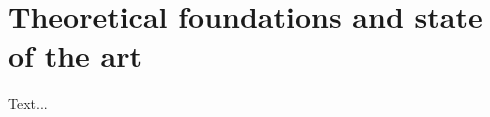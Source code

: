 %
%
%

\chapter{Theoretical foundations and state of the art}
\label{chap:Theoretical foundations and state of the art}
%
Text...
